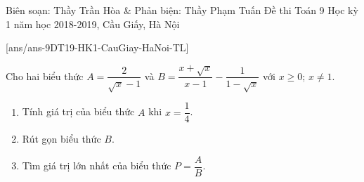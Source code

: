 
\begin{name}
{Biên soạn: Thầy Trần Hòa \& Phản biện: Thầy Phạm Tuấn}
{Đề thi Toán 9 Học kỳ 1 năm học 2018-2019, Cầu Giấy, Hà Nội }
\end{name}
\setcounter{bt}{0}
[ans/ans-9DT19-HK1-CauGiay-HaNoi-TL]

\begin{bt}%
Cho hai biểu thức $A=\dfrac{2}{\sqrt{x}-1}$ và $B=\dfrac{x+\sqrt{x}}{x-1}-\dfrac{1}{1-\sqrt{x}}$ với $x\ge 0$; $x\neq 1$.
\begin{enumerate}
\item Tính giá trị của biểu thức $A$ khi $x=\dfrac{1}{4}$.
\item Rút gọn biểu thức $B$.
\item Tìm giá trị lớn nhất của biểu thức $P=\dfrac{A}{B}$.
\end{enumerate}
\end{bt}
